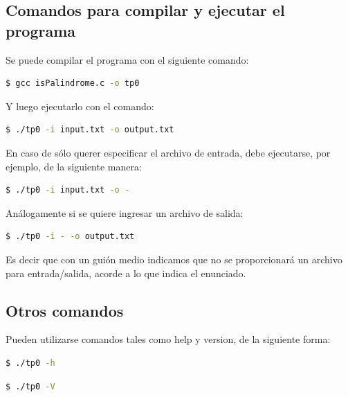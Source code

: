 \documentclass[a4paper]{article}
\begin{document}
\subsection{Comandos para compilar y ejecutar el programa}

Se puede compilar el programa con el siguiente comando:

\begin{lstlisting}[language=bash]
  $ gcc isPalindrome.c -o tp0
\end{lstlisting}


Y luego ejecutarlo con el comando:

\begin{lstlisting}[language=bash]
  $ ./tp0 -i input.txt -o output.txt
\end{lstlisting}

En caso de sólo querer especificar el archivo de entrada, debe ejecutarse, por ejemplo, de la siguiente manera:

\begin{lstlisting}[language=bash]
  $ ./tp0 -i input.txt -o -
\end{lstlisting}

Análogamente si se quiere ingresar un archivo de salida:

\begin{lstlisting}[language=bash]
  $ ./tp0 -i - -o output.txt
\end{lstlisting}

Es decir que con un guión medio indicamos que no se proporcionará un archivo para entrada/salida, acorde a lo que indica el enunciado.

\subsection{Otros comandos}

Pueden utilizarse comandos tales como help y version, de la siguiente forma:

\begin{lstlisting}[language=bash]
  $ ./tp0 -h
\end{lstlisting}

\begin{lstlisting}[language=bash]
  $ ./tp0 -V
\end{lstlisting}
\end{document}
